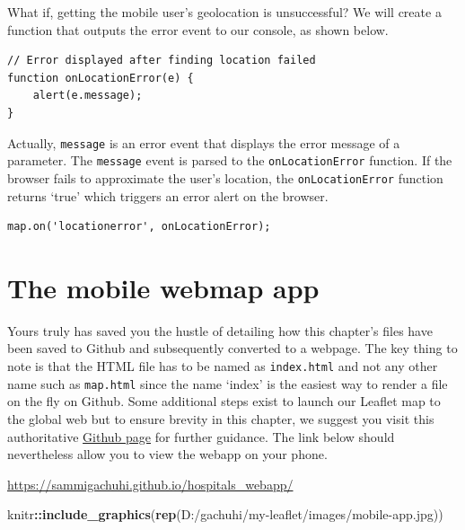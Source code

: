 \documentclass[
]{book}
\newenvironment{Shaded}{\begin{snugshade}}{\end{snugshade}}
\newcommand{\FunctionTok}[1]{\textcolor[rgb]{0.13,0.29,0.53}{\textbf{#1}}}
\newcommand{\NormalTok}[1]{#1}
\newcommand{\SpecialCharTok}[1]{\textcolor[rgb]{0.81,0.36,0.00}{\textbf{#1}}}
\newcommand{\StringTok}[1]{\textcolor[rgb]{0.31,0.60,0.02}{#1}}
\begin{document}
What if, getting the mobile user's geolocation is unsuccessful? We will create a function that outputs the error event to our console, as shown below.

\begin{verbatim}
// Error displayed after finding location failed
function onLocationError(e) {
    alert(e.message);
}
\end{verbatim}

Actually, \texttt{message} is an error event that displays the error message of a parameter. The \texttt{message} event is parsed to the \texttt{onLocationError} function. If the browser fails to approximate the user's location, the \texttt{onLocationError} function returns `true' which triggers an error alert on the browser.

\begin{verbatim}
map.on('locationerror', onLocationError);
\end{verbatim}

\hypertarget{the-mobile-webmap-app}{%
\section{The mobile webmap app}\label{the-mobile-webmap-app}}

Yours truly has saved you the hustle of detailing how this chapter's files have been saved to Github and subsequently converted to a webpage. The key thing to note is that the HTML file has to be named as \texttt{index.html} and not any other name such as \texttt{map.html} since the name `index' is the easiest way to render a file on the fly on Github. Some additional steps exist to launch our Leaflet map to the global web but to ensure brevity in this chapter, we suggest you visit this authoritative \href{https://docs.github.com/en/pages/getting-started-with-github-pages/creating-a-github-pages-site}{Github page} for further guidance. The link below should nevertheless allow you to view the webapp on your phone.

\url{https://sammigachuhi.github.io/hospitals_webapp/}

\begin{Shaded}
\begin{Highlighting}[]
\NormalTok{knitr}\SpecialCharTok{::}\FunctionTok{include\_graphics}\NormalTok{(}\FunctionTok{rep}\NormalTok{(}\StringTok{\textquotesingle{}D:/gachuhi/my{-}leaflet/images/mobile{-}app.jpg\textquotesingle{}}\NormalTok{))}
\end{Highlighting}
\end{Shaded}
\end{document}
